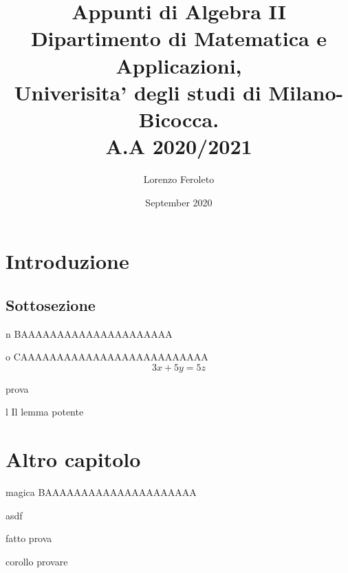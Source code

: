 \documentclass{article}
\title{
  \Large{\bf{Appunti di Algebra II}} \\
  Dipartimento di Matematica e Applicazioni,\\
  Univerisita' degli studi di Milano-Bicocca. \\
  A.A 2020/2021
}
\author{Lorenzo Feroleto}
\date{September 2020}
\begin{document}
\maketitle
\newpage

\section{Introduzione}

\subsection{Sottosezione}

\lipsum[2]

\begin{defn}{n}
BAAAAAAAAAAAAAAAAAAAAA
\end{defn}

\lipsum[3]

\begin{theo}{o}
CAAAAAAAAAAAAAAAAAAAAAAAAAA
\[3x + 5y = 5z\]
\end{theo}
\begin{dimostrazione}
prova
\end{dimostrazione}

\begin{lem}[Il lemmone]{l}
Il lemma potente
\end{lem}

\section{Altro capitolo}
\begin{defn}{magica}
  BAAAAAAAAAAAAAAAAAAAAA
\end{defn}

\begin{dimostrazione} 
asdf
\end{dimostrazione}

\begin{prop}[fatto]{fatto}
prova
\end{prop}
\begin{dimostrazione}
\lipsum[3]
\end{dimostrazione}

\begin{coroll}[corollo]{corollo}
  provare
\end{coroll}
\end{document}
